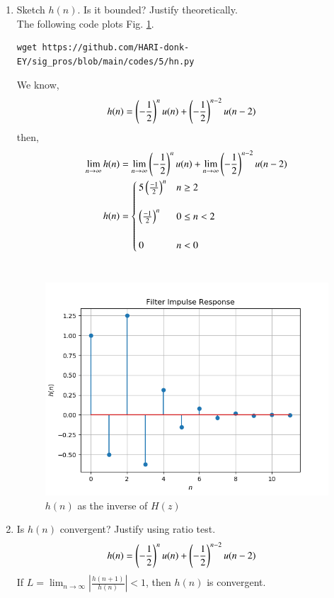 \documentclass[journal,12pt,twocolumn]{IEEEtran}
\renewcommand\thesection{\arabic{section}}
\begin{document}
\begin{enumerate}[label=\thesection.\arabic*]
\item Sketch $h(n)$. Is it bounded? Justify theoretically. 
\\
\solution The following code plots Fig. \ref{fig:hn}.
\begin{lstlisting}
wget https://github.com/HARI-donk-EY/sig_pros/blob/main/codes/5/hn.py
\end{lstlisting}
We know,\\
\begin{align*}
h(n) &= \left(-\frac{1}{2}\right)^{n}u(n) + \left(-\frac{1}{2}\right)^{n-2}u(n-2)
\end{align*}
then,
\begin{align}
\lim_{n\to\infty} h(n) &= \lim_{n\to\infty}\left(-\frac{1}{2}\right)^{n}u(n) + \lim_{n\to\infty}\left(-\frac{1}{2}\right)^{n-2}u(n-2)\\
h(n) &=
\begin{cases}
5\left(\frac{-1}{2}\right)^n   & n \geq 2\\ \\
\left(\frac{-1}{2}\right)^n    & 0 \leq n < 2\\ \\
0 & n < 0
\end{cases}
\end{align}
\ \\
\begin{figure}[!ht]
\centering
\includegraphics[width=\columnwidth]{./figs/hn}
\caption{$h(n)$ as the inverse of $H(z)$}
\label{fig:hn}
\end{figure}


\item Is $h(n)$ convergent? Justify using ratio test.\\
\solution
\begin{align}
h(n) &= \left(-\frac{1}{2}\right)^{n}u(n) + \left(-\frac{1}{2}\right)^{n-2}u(n-2)
\end{align}
If $L=\lim_{n\to\infty}\left|\frac{h(n+1)}{h(n)}\right| < 1$, then $h(n)$ is convergent.


\end{enumerate}
\end{document}
